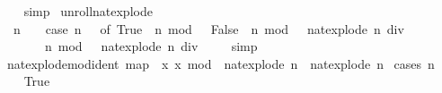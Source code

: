 \begin{isabellebody}
%
\isadelimproof
\ \ %
\endisadelimproof
%
\isatagproof
{}\isamarkupfalse%
\ simp%
\endisatagproof
{\isafoldproof}%
%
\isadelimproof
\isanewline
%
\endisadelimproof
\isanewline
{}\isamarkupfalse%
\ unroll{\isacharunderscore}{\kern0pt}nat{\isacharunderscore}{\kern0pt}explode{\isacharprime}{\kern0pt}{\isacharcolon}{\kern0pt}\ \isanewline
\ {\isacartoucheopen}{\isasymnot}\ n\ {\isacharless}{\kern0pt}\ {}{}\ {\isasymLongrightarrow}\ {\isacharparenleft}{\kern0pt}case\ n\ {\isacharless}{\kern0pt}\ {}{}\ of\ True\ {\isasymRightarrow}\ {\isacharbrackleft}{\kern0pt}n\ mod\ {}{}{\isacharbrackright}{\kern0pt}\ {\isacharbar}{\kern0pt}\ False\ {\isasymRightarrow}\ n\ mod\ {}{}\ {\isacharhash}{\kern0pt}\ nat{\isacharunderscore}{\kern0pt}explode{\isacharprime}{\kern0pt}\ {\isacharparenleft}{\kern0pt}n\ div\ {}{}{\isacharparenright}{\kern0pt}{\isacharparenright}{\kern0pt}\ {\isacharequal}{\kern0pt}\isanewline
\ \ \ \ \ \ \ {\isacharparenleft}{\kern0pt}n\ mod\ {}{}\ {\isacharhash}{\kern0pt}\ nat{\isacharunderscore}{\kern0pt}explode{\isacharprime}{\kern0pt}\ {\isacharparenleft}{\kern0pt}n\ div\ {}{}{\isacharparenright}{\kern0pt}{\isacharparenright}{\kern0pt}{\isacartoucheclose}\isanewline
%
\isadelimproof
\ \ %
\endisadelimproof
%
\isatagproof
{}\isamarkupfalse%
\ simp%
\endisatagproof
{\isafoldproof}%
%
\isadelimproof
\isanewline
%
\endisadelimproof
\isanewline
{}\isamarkupfalse%
\ nat{\isacharunderscore}{\kern0pt}explode{\isacharunderscore}{\kern0pt}mod{\isacharunderscore}{\kern0pt}{}{}{\isacharunderscore}{\kern0pt}ident{\isacharcolon}{\kern0pt}\ {\isacartoucheopen}map\ {\isacharparenleft}{\kern0pt}{\isasymlambda}\ x{\isachardot}{\kern0pt}\ x\ mod\ {}{}{\isacharparenright}{\kern0pt}\ {\isacharparenleft}{\kern0pt}nat{\isacharunderscore}{\kern0pt}explode{\isacharprime}{\kern0pt}\ n{\isacharparenright}{\kern0pt}\ {\isacharequal}{\kern0pt}\ nat{\isacharunderscore}{\kern0pt}explode{\isacharprime}{\kern0pt}\ n{\isacartoucheclose}\isanewline
%
\isadelimproof
%
\endisadelimproof
%
\isatagproof
{}\isamarkupfalse%
\ {\isacharparenleft}{\kern0pt}cases\ {\isacartoucheopen}n\ {\isacharless}{\kern0pt}\ {}{}{\isacartoucheclose}{\isacharparenright}{\kern0pt}\isanewline
\ \ \isamarkupfalse%
\ True\isanewline
\ \ \isamarkupfalse%
\ \isamarkupfalse%

\end{isabellebody}
